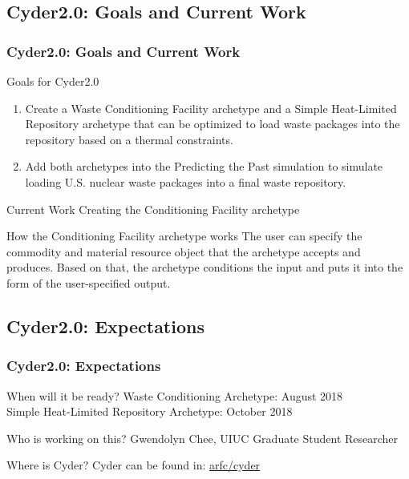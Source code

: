 \subsection{Cyder2.0: Goals and Current Work}
\begin{frame}
  \frametitle{Cyder2.0: Goals and Current Work}

\begin{block}{Goals for Cyder2.0}
\begin{enumerate}
	\item Create a Waste Conditioning Facility archetype and a Simple Heat-Limited Repository archetype that can be optimized to load waste packages into the repository based on a thermal constraints. 
	\item Add both archetypes into the Predicting the Past \Cyclus simulation to simulate loading U.S. nuclear waste packages into a final waste repository. 
\end{enumerate}
\end{block}

\begin{block}{Current Work}
	Creating the Conditioning Facility archetype
\end{block}

\begin{block}{How the Conditioning Facility archetype works}
The user can specify the commodity and material resource object that the archetype accepts and produces. Based on that, the archetype conditions the input and puts it into the form of the user-specified output.
\end{block}

\end{frame}

\subsection{Cyder2.0: Expectations}

\begin{frame}
\frametitle{Cyder2.0: Expectations}

\begin{block}{When will it be ready?}
	Waste Conditioning Archetype: August 2018 \\
	Simple Heat-Limited Repository Archetype: October 2018 
\end{block}

\begin{block}{Who is working on this?}
	Gwendolyn Chee, UIUC Graduate Student Researcher
\end{block}

\begin{block}{Where is Cyder?}
	Cyder can be found in: \href{https://github.com/arfc/cyder}{arfc/cyder} 
\end{block}

\end{frame}